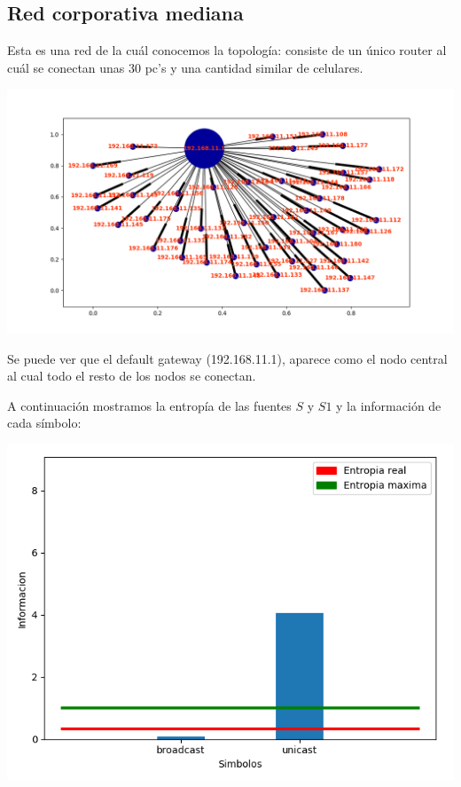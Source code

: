 \subsection{Red corporativa mediana}

Esta es una red de la cuál conocemos la topología: consiste de un único router al cuál se conectan unas 30 pc's y una cantidad similar de celulares.


\includegraphics[scale=0.65]{imagenes/captura-red-trabajo-grafo.png}

Se puede ver que el default gateway (192.168.11.1), aparece como el nodo central al cual todo el resto de los nodos se conectan.

A continuación mostramos la entropía de las fuentes $S$ y $S1$ y la información de cada símbolo:

\includegraphics[scale=0.65]{imagenes/captura-red-trabajo-fuente-s.png}

